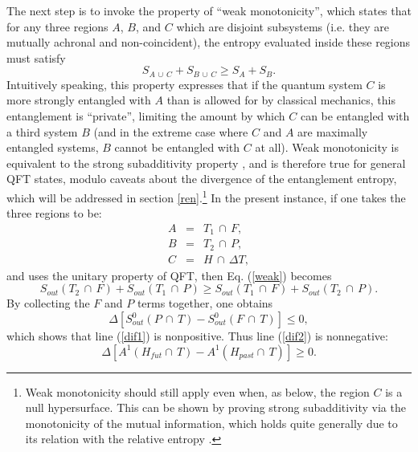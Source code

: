 \documentclass{article}
\begin{document}
The next step is to invoke the property of ``weak monotonicity'', which states that for any three regions $A$, $B$, and $C$ which are disjoint subsystems (i.e. they are mutually achronal and non-coincident), the entropy evaluated inside these regions must satisfy
\begin{equation}\label{weak}
S_{A\,\cup\,C} + S_{B\,\cup\,C} \ge S_{A} + S_{B}.
\end{equation}
Intuitively speaking, this property expresses that if the quantum system $C$ is more strongly entangled with $A$ than is allowed for by classical mechanics, this entanglement is ``private'', limiting the amount by which $C$ can be entangled with a third system $B$ (and in the extreme case where $C$ and $A$ are maximally entangled systems, $B$ cannot be entangled with $C$ at all).  Weak monotonicity is equivalent to the strong subadditivity property \cite{pipp03}, and is therefore true for general QFT states, modulo caveats about the divergence of the entanglement entropy, which will be addressed in section \ref{ren}.\footnote{Weak monotonicity should still apply even when, as below, the region $C$ is a null hypersurface.  This can be shown by proving strong subadditivity via the monotonicity of the mutual information, which holds quite generally due to its relation with the relative entropy \cite{CH04}.} In the present instance, if one takes the three regions to be:
\begin{eqnarray}
A &=& T_1\,\cap\,F, \\
B &=& T_2\,\cap\,P, \\
C &=& H\,\cap\,\Delta T,
\end{eqnarray} 
and uses the unitary property of QFT, then Eq. (\ref{weak}) becomes
\begin{equation}\label{weakapp}
S_{out}(T_2\,\cap\,F) + S_{out}(T_1\,\cap \,P) 
\ge S_{out}(T_1\,\cap\,F) + S_{out}(T_2\,\cap \,P).
\end{equation}
By collecting the $F$ and $P$ terms together, one obtains
\begin{equation}\label{nonpos}
\Delta \left[ S_{out}^{0}(P\,\cap\,T) 
- S_{out}^{0}(F\,\cap\,T) \right] \le 0,
\end{equation}
which shows that line (\ref{dif1}) is nonpositive.  Thus line (\ref{dif2}) is nonnegative:
\begin{equation}\label{deltaA}
\Delta \left[ A^{1}(H_{fut}\cap\,T) - A^{1}(H_{past}\cap\,T) \right] \ge 0.
\end{equation}
\end{document}

